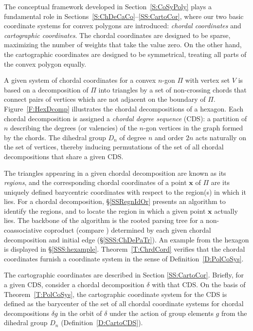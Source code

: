 \documentclass[12pt]{amsart}
\theoremstyle{plain}
\theoremstyle{definition}
\numberwithin{equation}{section}
\begin{document}
The conceptual framework developed in Section~\ref{S:CoSyPoly} plays a fundamental role in Sections~\ref{S:ChDeCaCo}--\ref{SS:CartoCor}, where our two basic coordinate systems for convex polygons are introduced: \emph{chordal coordinates} and \emph{cartographic coordinates}. The chordal coordinates are designed to be sparse, maximizing the number of weights that take the value zero. On the other hand, the cartographic coordinates are designed to be symmetrical, treating all parts of the convex polygon equally.


A given system of chordal coordinates for a convex $n$-gon $\Pi$ with vertex set $V$ is based on a decomposition of $\Pi$ into triangles by a set of non-crossing chords that connect pairs of vertices which are not adjacent on the boundary of $\Pi$. Figure~\ref{F:HexDcomp} illustrates the chordal decompositions of a hexagon. Each chordal decomposition is assigned a \emph{chordal degree sequence} (CDS): a partition of $n$ describing the degrees (or valencies) of the $n$-gon vertices in the graph formed by the chords. The dihedral group $D_n$ of degree $n$ and order $2n$ acts naturally on the set of vertices, thereby inducing permutations of the set of all chordal decompositions that share a given CDS.


The triangles appearing in a given chordal decomposition are known as its \emph{regions}, and the corresponding chordal coordinates of a point $\mathbf x$ of $\Pi$ are its uniquely defined barycentric coordinates with respect to the region(s) in which it lies. For a chordal decomposition, \S\ref{SSRegnIdOr} presents an algorithm to identify the regions, and to locate the region in which a given point $\mathbf x$ actually lies. The backbone of the algorithm is the rooted parsing tree for a non-coassociative coproduct (compare \cite[Def'n.~2.3(d)]{Sm171}) determined by each given chordal decomposition and initial edge (\S\ref{SSS:ChDePaTr}). An example from the hexagon is displayed in \S\ref{SSS:hexample}. Theorem~\ref{T:ChrdCord} verifies that the chordal coordinates furnish a coordinate system in the sense of Definition~\ref{D:PolCoSys}.


The cartographic coordinates are described in Section \ref{SS:CartoCor}. Briefly, for a given CDS, consider a chordal decomposition $\delta$ with that CDS. On the basis of Theorem~\ref{T:PolCoSys}, the cartographic coordinate system for the CDS is defined as the barycenter of the set of all chordal coordinate systems for chordal decompositions $\delta g$ in the orbit of $\delta$ under the action of group elements $g$ from the dihedral group $D_n$ (Definition~\ref{D:CartoCDS}).
\end{document}
